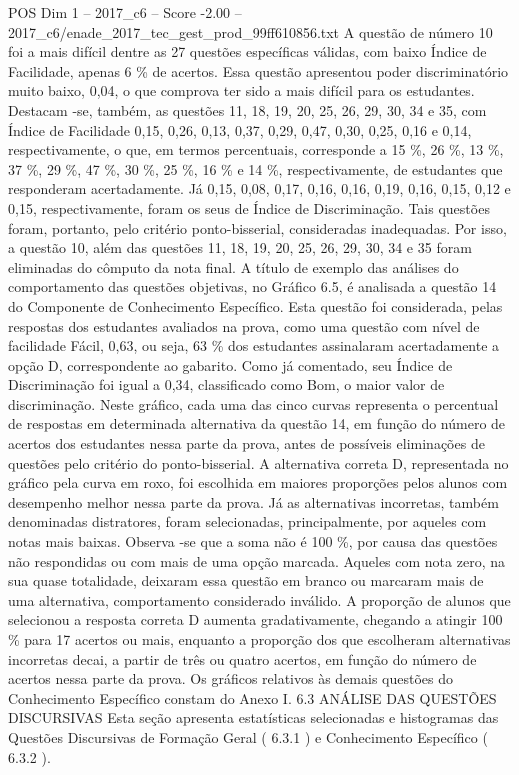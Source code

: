 \begin{textsample}{POS Dim 1 – 2017\_c6 – Score -2.00 – 2017\_c6/enade\_2017\_tec\_gest\_prod\_99ff610856.txt}
A questão de número 10 foi a mais difícil dentre as 27 questões específicas válidas, com baixo Índice de Facilidade, apenas 6 \% de acertos.
Essa questão apresentou poder discriminatório muito baixo, 0,04, o que comprova ter sido a mais difícil para os estudantes.
Destacam -se, também, as questões 11, 18, 19, 20, 25, 26, 29, 30, 34 e 35, com Índice de Facilidade 0,15, 0,26, 0,13, 0,37, 0,29, 0,47, 0,30, 0,25, 0,16 e 0,14, respectivamente, o que, em termos percentuais, corresponde a 15 \%, 26 \%, 13 \%, 37 \%, 29 \%, 47 \%, 30 \%, 25 \%, 16 \% e 14 \%, respectivamente, de estudantes que responderam acertadamente.
Já 0,15, 0,08, 0,17, 0,16, 0,16, 0,19, 0,16, 0,15, 0,12 e 0,15, respectivamente, foram os seus de Índice de Discriminação.
Tais questões foram, portanto, pelo critério ponto-bisserial, consideradas inadequadas.
Por isso, a questão 10, além das questões 11, 18, 19, 20, 25, 26, 29, 30, 34 e 35 foram eliminadas do cômputo da nota final.
A título de exemplo das análises do comportamento das questões objetivas, no Gráfico 6.5, é analisada a questão 14 do Componente de Conhecimento Específico.
Esta questão foi considerada, pelas respostas dos estudantes avaliados na prova, como uma questão com nível de facilidade Fácil, 0,63, ou seja, 63 \% dos estudantes assinalaram acertadamente a opção D, correspondente ao gabarito.
Como já comentado, seu Índice de Discriminação foi igual a 0,34, classificado como Bom, o maior valor de discriminação.
Neste gráfico, cada uma das cinco curvas representa o percentual de respostas em determinada alternativa da questão 14, em função do número de acertos dos estudantes nessa parte da prova, antes de possíveis eliminações de questões pelo critério do ponto-bisserial.
A alternativa correta D, representada no gráfico pela curva em roxo, foi escolhida em maiores proporções pelos alunos com desempenho melhor nessa parte da prova.
Já as alternativas incorretas, também denominadas distratores, foram selecionadas, principalmente, por aqueles com notas mais baixas.
Observa -se que a soma não é 100 \%, por causa das questões não respondidas ou com mais de uma opção marcada.
Aqueles com nota zero, na sua quase totalidade, deixaram essa questão em branco ou marcaram mais de uma alternativa, comportamento considerado inválido.
A proporção de alunos que selecionou a resposta correta D aumenta gradativamente, chegando a atingir 100 \% para 17 acertos ou mais, enquanto a proporção dos que escolheram alternativas incorretas decai, a partir de três ou quatro acertos, em função do número de acertos nessa parte da prova.
Os gráficos relativos às demais questões do Conhecimento Específico constam do Anexo I. 6.3 ANÁLISE DAS QUESTÕES DISCURSIVAS Esta seção apresenta estatísticas selecionadas e histogramas das Questões Discursivas de Formação Geral ( 6.3.1 ) e Conhecimento Específico ( 6.3.2 ).

\end{textsample}
